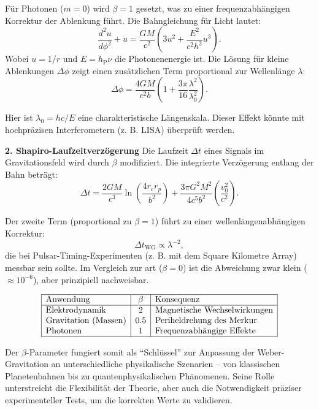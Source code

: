 Für Photonen ($m=0$) wird $\beta=1$ gesetzt, was zu einer frequenzabhängigen Korrektur der Ablenkung führt. Die Bahngleichung für Licht lautet:
\begin{equation}
    \frac{d^2u}{d\phi^2} + u = \frac{GM}{c^2} \left(3u^2 + \frac{E^2}{c^2 h^2} u^3\right).
\end{equation}
Wobei $u=1/r$ und $E=h_\text{P}\nu$ die Photonenenergie ist. Die Lösung für kleine Ablenkungen $\Delta\phi$ zeigt einen zusätzlichen Term proportional zur Wellenlänge $\lambda$:
\begin{equation}
\Delta \phi = \frac{4GM}{c^2 b} \left(1 + \frac{3\pi}{16} \frac{\lambda^2}{\lambda_0^2}\right).
\end{equation}

Hier ist $\lambda_0=hc/E$ eine charakteristische Längenskala. Dieser Effekt könnte mit hochpräzisen Interferometern (z. B. LISA) überprüft werden.

\textbf{2. Shapiro-Laufzeitverzögerung}
Die Laufzeit $\Delta t$ eines Signals im Gravitationsfeld wird durch $\beta$ modifiziert. Die integrierte Verzögerung entlang der Bahn beträgt:
\begin{equation}
\Delta t = \frac{2GM}{c^3} \ln\left(\frac{4r_e r_p}{b^2}\right) + \frac{3\pi G^2 M^2}{4c^5 b^2} \left(\frac{v_0^2}{c^2}\right).
\end{equation}

Der zweite Term (proportional zu $\beta=1$) führt zu einer wellenlängenabhängigen Korrektur:
\begin{equation}
    \Delta t_\text{WG} \propto \lambda^{-2},
\end{equation}
die bei Pulsar-Timing-Experimenten (z. B. mit dem Square Kilometre Array) messbar sein sollte. Im Vergleich zur \gls{art} ($\beta=0$) ist die Abweichung zwar klein ($\approx 10^{-6}$),
aber prinzipiell nachweisbar.

\[
\begin{array}{|l|c|l|}
\hline
\text{Anwendung} & \beta & \text{Konsequenz} \\
\hline
\text{Elektrodynamik} & 2 & \text{Magnetische Wechselwirkungen} \\
\text{Gravitation (Massen)} & 0.5 & \text{Periheldrehung des Merkur} \\
\text{Photonen} & 1 & \text{Frequenzabhängige Effekte} \\
\hline
\end{array}
\]

Der $\beta$-Parameter fungiert somit als \enquote{Schlüssel} zur Anpassung der Weber-Gravitation an unterschiedliche physikalische Szenarien – von klassischen Planetenbahnen
bis zu quantenphysikalischen Phänomenen. Seine Rolle unterstreicht die Flexibilität der Theorie, aber auch die Notwendigkeit präziser experimenteller Tests, um die korrekten
Werte zu validieren.

